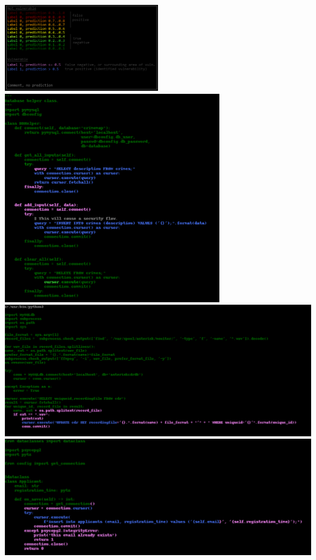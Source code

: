 \documentclass[
	a4paper,
	pagesize,
	pdftex,
	12pt,
	twoside, %
	BCOR=5mm, %
	ngerman,
	fleqn,
	final,
	]{scrartcl}
\begin{document}
\includegraphics[width=0.5\textwidth]{img/Legende}\\
\includegraphics[width=0.7\textwidth]{img/Example1}\\
\includegraphics[width=1\textwidth]{img/Example2}\\
\includegraphics[width=1\textwidth]{img/Example3}
\end{document}
